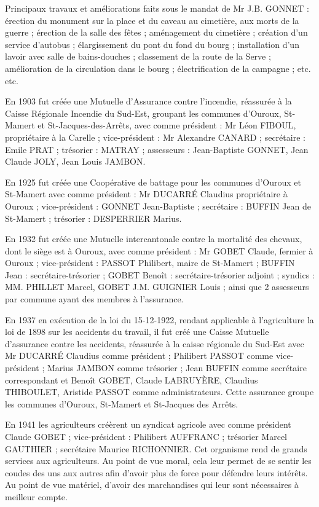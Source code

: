 Principaux travaux et améliorations faits sous le mandat de Mr J.B. GONNET : érection du monument sur la place et du caveau au cimetière, aux morts de la guerre ; érection de la salle des fêtes ; aménagement du cimetière ; création d'un service d'autobus ; élargissement du pont du fond du bourg ; installation d'un lavoir avec salle de bains-douches ; classement de la route de la Serve ; amélioration de la circulation dans le bourg ; électrification de la campagne ; etc. etc.

En 1903 fut créée une Mutuelle d'Assurance contre l'incendie, réassurée à la Caisse Régionale Incendie du Sud-Est, groupant les communes d'Ouroux, St-Mamert et St-Jacques-des-Arrêts, avec comme président : Mr Léon FIBOUL, propriétaire à la Carelle ; vice-président : Mr Alexandre CANARD ; secrétaire : Emile PRAT ; trésorier : MATRAY ; assesseurs : Jean-Baptiste GONNET, Jean Claude JOLY, Jean Louis JAMBON.

En 1925 fut créée une Coopérative de battage pour les communes d'Ouroux et St-Mamert avec comme président : Mr DUCARRÉ Claudius propriétaire à Ouroux ; vice-président : GONNET Jean-Baptiste ; secrétaire : BUFFIN Jean de St-Mamert ; trésorier : DESPERRIER Marius.

En 1932 fut créée une Mutuelle intercantonale contre la mortalité des chevaux, dont le siège est à Ouroux, avec comme président : Mr GOBET Claude, fermier à Ouroux ; vice-président : PASSOT Philibert, maire de St-Mamert ; BUFFIN Jean : secrétaire-trésorier ; GOBET Benoît : secrétaire-trésorier adjoint ; syndics : MM. PHILLET Marcel, GOBET J.M. GUIGNIER Louis ; ainsi que 2 assesseurs par commune ayant des membres à l'assurance.

En 1937 en exécution de la loi du 15-12-1922, rendant applicable à l'agriculture la loi de 1898 sur les accidents du travail, il fut créé une Caisse Mutuelle d'assurance contre les accidents, réassurée à la caisse régionale du Sud-Est avec Mr DUCARRÉ Claudius comme président ; Philibert PASSOT comme vice-président ; Marius JAMBON comme trésorier ; Jean BUFFIN comme secrétaire correspondant et Benoît GOBET, Claude LABRUYÈRE, Claudius THIBOULET, Aristide PASSOT comme administrateurs. Cette assurance groupe les communes d'Ouroux, St-Mamert et St-Jacques des Arrêts.

En 1941 les agriculteurs créèrent un syndicat agricole avec comme président Claude GOBET ; vice-président : Philibert AUFFRANC ; trésorier Marcel GAUTHIER ; secrétaire Maurice RICHONNIER. Cet organisme rend de grands services aux agriculteurs. Au point de vue moral, cela leur permet de se sentir les coudes des uns aux autres afin d'avoir plus de force pour défendre leurs intérêts. Au point de vue matériel, d'avoir des marchandises qui leur sont nécessaires à meilleur compte.

